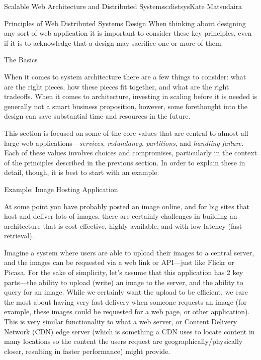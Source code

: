 \begin{aosachapter}{Scalable Web Architecture and Distributed Systems}{s:distsys}{Kate Matsudaira}
\begin{aosasect1}{Principles of Web Distributed Systems Design}
When thinking about designing any sort of web application it is
important to consider these key principles, even if it is to
acknowledge that a design may sacrifice one or more of them.

\end{aosasect1}

\begin{aosasect1}{The Basics}

When it comes to system architecture there are a few things to
consider: what are the right pieces, how these pieces fit together,
and what are the right tradeoffs. When it comes to architecture,
investing in scaling before it is needed is generally not a smart
business proposition, however, some forethought into the design can
save substantial time and resources in the future.

This section is focused on some of the core values that are central to
almost all large web applications---\emph{services},
\emph{redundancy}, \emph{partitions}, and \emph{handling
failure}. Each of these values involves choices and compromises,
particularly in the context of the principles described in the
previous section. In order to explain these in detail, though, it is
best to start with an example.

\begin{aosasect2}{Example: Image Hosting Application}

At some point you have probably posted an image online, and for big
sites that host and deliver lots of images, there are certainly
challenges in building an architecture that is cost effective, highly
available, and with low latency (fast retrieval).

Imagine a system where users are able to upload their images to a
central server, and the images can be requested via a web link or
API---just like Flickr or Picasa. For the sake of simplicity, let's
assume that this application has 2 key parts---the ability to upload
(write) an image to the server, and the ability to query for an
image. While we certainly want the upload to be efficient, we care the
most about having very fast delivery when someone requests an image
(for example, these images could be requested for a web page, or other
application). This is very similar functionality to what a web server,
or Content Delivery Network (CDN) edge server (which is something a
CDN uses to locate content in many locations so the content the users
request are geographically/physically closer, resulting in faster
performance) might provide.


\end{aosasect2}
\end{aosasect1}
\end{aosachapter}
